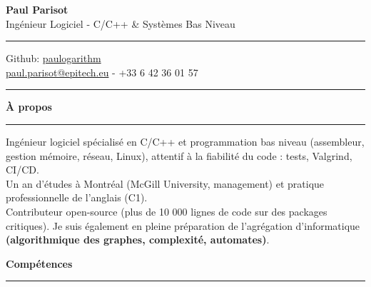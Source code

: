 \documentclass[9pt]{extarticle}
\begin{document}
\begin{center}
	{\huge\bfseries Paul Parisot}
	\\[4pt]
	{\Large Ingénieur Logiciel - C/C++ \& Systèmes Bas Niveau}
	\\
\end{center}


\par\vspace{-5pt}
\rule{\linewidth}{0.4pt}
\par\vspace{-5pt}

\begin{center}
	Github: \href{https://github.com/paulogarithm}{paulogarithm}
	\\
	\href{mailto:paul.parisot@epitech.eu}{paul.parisot@epitech.eu} - +33 6 42 36 01 57
	\\
\end{center}

\par\vspace{-10pt}
\rule{\linewidth}{0.4pt}
\par\vspace{7pt}


{\large\bfseries À propos}
\par\vspace{-8pt}
\rule{\linewidth}{0.4pt}
\par\vspace{5pt}

Ingénieur logiciel spécialisé en C/C++ et programmation bas niveau (assembleur, gestion mémoire, réseau, Linux), attentif à la fiabilité du code : tests, Valgrind, CI/CD.
\\
Un an d'études à Montréal (McGill University, management) et pratique professionnelle de l'anglais (C1).
\\
Contributeur open-source (plus de 10 000 lignes de code sur des packages critiques). Je suis également en pleine préparation de l'agrégation d'informatique {\bfseries (algorithmique des graphes, complexité, automates)}.
\par\vspace{5pt}


{\large\bfseries Compétences}
\par\vspace{-8pt}
\rule{\linewidth}{0.4pt}
\par\vspace{5pt}
\end{document}
